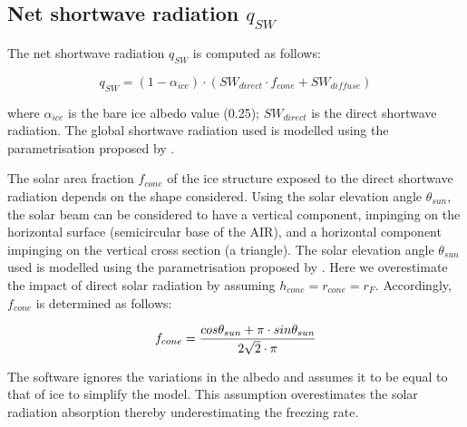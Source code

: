 \documentclass[utf8]{frontiersSCNS}
\begin{document}
\subsection{Net shortwave radiation \texorpdfstring{$q_{SW}$}{Lg}}
\label{sec:SW}

The net shortwave radiation $q_{SW}$ is computed as follows:

\begin{equation} q_{SW} = (1- \alpha_{ice}) \cdot ( SW_{direct} \cdot f_{cone} + SW_{diffuse})
\label{eqn:SW} \end{equation}

where $\alpha_{ice}$ is the bare ice albedo value (0.25); $SW_{direct}$ is the direct shortwave radiation. The
global shortwave radiation used is modelled using the parametrisation proposed by \cite{woolfComputationSolarElevation1968}.

The solar area fraction $f_{cone}$ of the ice structure exposed to the direct shortwave radiation depends on the
shape considered. Using the solar elevation angle $\theta_{sun}$, the solar beam can be considered to have a
vertical component, impinging on the horizontal surface (semicircular base of the AIR), and a horizontal
component impinging on the vertical cross section (a triangle). The solar elevation angle $\theta_{sun}$ used is
modelled using the parametrisation proposed by \cite{woolfComputationSolarElevation1968}. Here we overestimate the impact of direct
solar radiation by assuming $h_{cone} = r_{cone} = r_{F}$. Accordingly, $f_{cone}$ is determined as follows:

\begin{equation}
	\begin{split}
		f_{cone}& =\frac{ cos \theta_{sun} + \pi \cdot sin \theta_{sun} }{2\sqrt{2} \cdot \pi }\\
	\end{split}
	\label{ eqn:f_{cone}}
\end{equation}

The software ignores the variations in the albedo and assumes it to be equal to that of ice to simplify the
model. This assumption overestimates the solar radiation absorption thereby underestimating the freezing rate.


 
\end{document}

